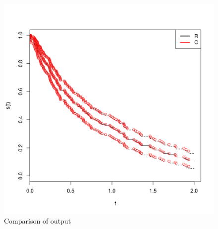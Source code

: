 \documentclass{article}
\begin{document}
\begin{center}
\begin{figure}[h!]
	\caption{Comparison of output}
	\centering
	\includegraphics[scale=0.50]{comparison}
\end{figure}
\end{center}
\end{document}
